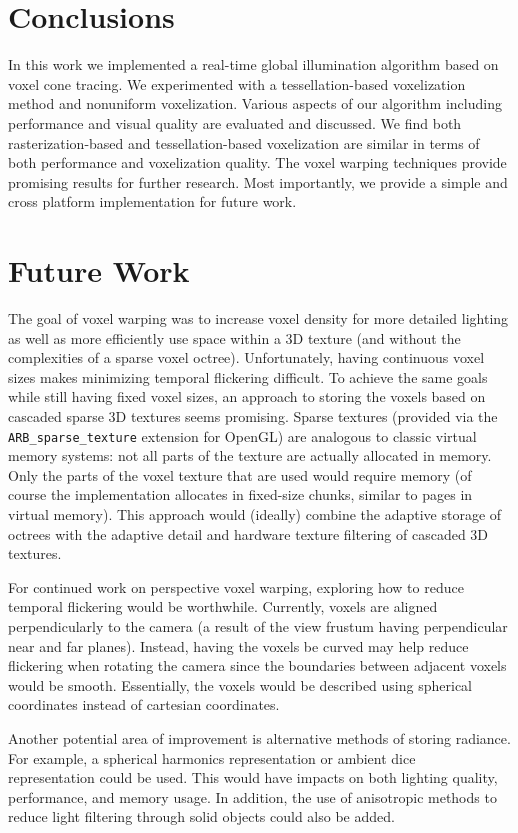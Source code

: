 \section{Conclusions}
In this work we implemented a real-time global illumination algorithm based on voxel cone tracing. We experimented with a tessellation-based voxelization method and nonuniform voxelization. Various aspects of our algorithm including performance and visual quality are evaluated and discussed. We find both rasterization-based and tessellation-based voxelization are similar in terms of both performance and voxelization quality. The voxel warping techniques provide promising results for further research. Most importantly, we provide a simple and cross platform implementation for future work.

\section{Future Work}
The goal of voxel warping was to increase voxel density for more detailed lighting as well as more efficiently use space within a 3D texture (and without the complexities of a sparse voxel octree). Unfortunately, having continuous voxel sizes makes minimizing temporal flickering difficult. To achieve the same goals while still having fixed voxel sizes, an approach to storing the voxels based on cascaded sparse 3D textures seems promising. Sparse textures (provided via the \verb#ARB_sparse_texture# extension for OpenGL) are analogous to classic virtual memory systems: not all parts of the texture are actually allocated in memory. Only the parts of the voxel texture that are used would require memory (of course the implementation allocates in fixed-size chunks, similar to pages in virtual memory). This approach would (ideally) combine the adaptive storage of octrees with the adaptive detail and hardware texture filtering of cascaded 3D textures.

For continued work on perspective voxel warping, exploring how to reduce temporal flickering would be worthwhile. Currently, voxels are aligned perpendicularly to the camera (a result of the view frustum having perpendicular near and far planes). Instead, having the voxels be curved may help reduce flickering when rotating the camera since the boundaries between adjacent voxels would be smooth. Essentially, the voxels would be described using spherical coordinates instead of cartesian coordinates.

Another potential area of improvement is alternative methods of storing radiance. For example, a spherical harmonics representation or ambient dice~\cite{iwanicki2017ambient} representation could be used. This would have impacts on both lighting quality, performance, and memory usage. In addition, the use of anisotropic methods to reduce light filtering through solid objects could also be added.

